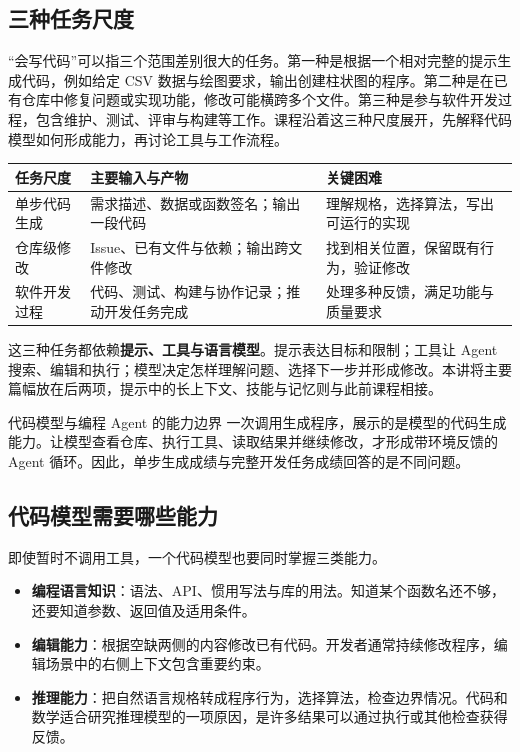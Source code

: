 \documentclass[11pt,a4paper]{article}
\begin{document}
\subsection{三种任务尺度}
“会写代码”可以指三个范围差别很大的任务。第一种是根据一个相对完整的提示生成代码，例如给定 CSV 数据与绘图要求，输出创建柱状图的程序。第二种是在已有仓库中修复问题或实现功能，修改可能横跨多个文件。第三种是参与软件开发过程，包含维护、测试、评审与构建等工作。课程沿着这三种尺度展开，先解释代码模型如何形成能力，再讨论工具与工作流程。

\begin{center}
\small
\begin{tabularx}{\textwidth}{L{2.4cm}XX}
\toprule
任务尺度 & 主要输入与产物 & 关键困难 \\
\midrule
单步代码生成 & 需求描述、数据或函数签名；输出一段代码 & 理解规格，选择算法，写出可运行的实现 \\
仓库级修改 & Issue、已有文件与依赖；输出跨文件修改 & 找到相关位置，保留既有行为，验证修改 \\
软件开发过程 & 代码、测试、构建与协作记录；推动开发任务完成 & 处理多种反馈，满足功能与质量要求 \\
\bottomrule
\end{tabularx}
\end{center}

这三种任务都依赖\textbf{提示、工具与语言模型}。提示表达目标和限制；工具让 Agent 搜索、编辑和执行；模型决定怎样理解问题、选择下一步并形成修改。本讲将主要篇幅放在后两项，提示中的长上下文、技能与记忆则与此前课程相接。

\begin{importantbox}{代码模型与编程 Agent 的能力边界}
一次调用生成程序，展示的是模型的代码生成能力。让模型查看仓库、执行工具、读取结果并继续修改，才形成带环境反馈的 Agent 循环。因此，单步生成成绩与完整开发任务成绩回答的是不同问题。
\end{importantbox}

\subsection{代码模型需要哪些能力}
即使暂时不调用工具，一个代码模型也要同时掌握三类能力。
\begin{itemize}
\item \textbf{编程语言知识}：语法、API、惯用写法与库的用法。知道某个函数名还不够，还要知道参数、返回值及适用条件。
\item \textbf{编辑能力}：根据空缺两侧的内容修改已有代码。开发者通常持续修改程序，编辑场景中的右侧上下文包含重要约束。
\item \textbf{推理能力}：把自然语言规格转成程序行为，选择算法，检查边界情况。代码和数学适合研究推理模型的一项原因，是许多结果可以通过执行或其他检查获得反馈。
\end{itemize}
\end{document}

